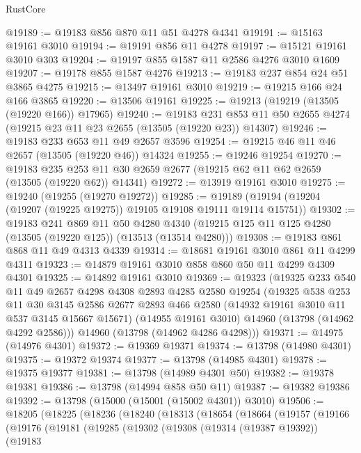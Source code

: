 \begin{lexlean}{RustCore}
\begin{coremodule}
@19189 := @19183 @856 @870 @11 @51 @4278 @4341
@19191 := @15163 @19161 @3010
@19194 := @19191 @856 @11 @4278
@19197 := @15121 @19161 @3010 @303
@19204 := @19197 @855 @1587 @11 @2586 @4276 @3010 @1609
@19207 := @19178 @855 @1587 @4276
@19213 := @19183 @237 @854 @24 @51 @3865 @4275
@19215 := @13497 @19161 @3010
@19219 := @19215 @166 @24 @166 @3865
@19220 := @13506 @19161
@19225 := @19213 (@19219 (@13505 (@19220 @166)) @17965)
@19240 := @19183
    @231
    @853
    @11
    @50
    @2655
    @4274
    (@19215 @23 @11 @23 @2655 (@13505 (@19220 @23)) @14307)
@19246 := @19183 @233 @653 @11 @49 @2657 @3596
@19254 := @19215 @46 @11 @46 @2657 (@13505 (@19220 @46)) @14324
@19255 := @19246 @19254
@19270 := @19183
    @235
    @253
    @11
    @30
    @2659
    @2677
    (@19215 @62 @11 @62 @2659 (@13505 (@19220 @62)) @14341)
@19272 := @13919 @19161 @3010
@19275 := @19240 (@19255 (@19270 @19272))
@19285 := @19189 (@19194 (@19204 (@19207 (@19225 @19275)) @19105 @19108 @19111 @19114 @15751))
@19302 := @19183
    @241
    @869
    @11
    @50
    @4280
    @4340
    (@19215 @125 @11 @125 @4280 (@13505 (@19220 @125)) (@13513 (@13514 @4280)))
@19308 := @19183 @861 @868 @11 @49 @4313 @4339
@19314 := @18681 @19161 @3010 @861 @11 @4299 @4311
@19323 := @14879 @19161 @3010 @858 @860 @50 @11 @4299 @4309 @4301
@19325 := @14892 @19161 @3010
@19369 := @19323
    (@19325
      @233
      @540
      @11
      @49
      @2657
      @4298
      @4308
      @2893
      @4285
      @2580
      @19254
      (@19325
        @538
        @253
        @11
        @30
        @3145
        @2586
        @2677
        @2893
        @466
        @2580
        (@14932 @19161 @3010 @11 @537 @3145 @15667 @15671)
        (@14955 @19161 @3010)
        @14960
        (@13798 (@14962 @4292 @2586)))
      @14960
      (@13798 (@14962 @4286 @4298)))
@19371 := @14975 (@14976 @4301)
@19372 := @19369 @19371
@19374 := @13798 (@14980 @4301)
@19375 := @19372 @19374
@19377 := @13798 (@14985 @4301)
@19378 := @19375 @19377
@19381 := @13798 (@14989 @4301 @50)
@19382 := @19378 @19381
@19386 := @13798 (@14994 @858 @50 @11)
@19387 := @19382 @19386
@19392 := @13798 (@15000 (@15001 (@15002 @4301)) @3010)
@19506 := @18205
    (@18225
      (@18236
        (@18240
          (@18313
            (@18654
              (@18664
                (@19157
                  (@19166
                    (@19176
                      (@19181
                        (@19285
                          (@19302
                            (@19308
                              (@19314 (@19387 @19392))
                              (@19183

\end{coremodule}
\end{lexlean}
